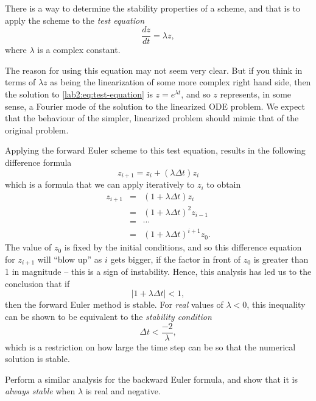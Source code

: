 There is a way to determine the stability properties of a scheme, and
that is to apply the scheme to the \emph{ test equation}
\begin{equation}
\frac{dz}{dt} = \lambda z, \label{lab2:eq:test-equation}
\end{equation}
where $\lambda$ is a complex constant.
\begin{note}
The reason for using this
equation may not seem very clear.  But if you think in terms of
$\lambda z$ as being the linearization of some more complex right hand
side, then the solution to \eqref{lab2:eq:test-equation} is
$z=e^{\lambda t}$, and so $z$ 
represents, in some sense, a Fourier 
mode of the solution to the linearized ODE problem.  
We expect that the behaviour of the simpler, linearized problem should
mimic that of the original problem.
\end{note}  
Applying the forward Euler scheme to this test equation, results  in
the following difference formula
\[ z_{i+1} = z_i+(\lambda \Delta t)z_i \]
which is a formula that we can apply iteratively to $z_i$ to obtain
\begin{eqnarray*}
z_{i+1} &=& (1+\lambda \Delta t)z_{i} \\
        &=& (1+\lambda \Delta t)^2 z_{i-1} \\
        &=& \cdots \\
        &=& (1+\lambda \Delta t)^{i+1} z_{0}.
\end{eqnarray*}
The value of $z_0$ is fixed by the initial conditions, and so this
difference equation for $z_{i+1}$ will ``blow up'' as $i$ gets bigger,
if the factor in front of $z_0$ is greater than 1 in magnitude -- this
is a sign of instability.
Hence, this analysis has led us to the conclusion that if 
\[
|1+\lambda\Delta t| < 1,
\]
then the forward Euler method is stable.
For \emph{ real} values of $\lambda<0$, this inequality can be shown to be
equivalent to the \emph{ stability condition}
\[
\Delta t < \frac{-2}{\lambda},
\]
which is a restriction on how large the time step can be so that the
numerical solution is stable.

\begin{problem}
  \label{lab2:prob:test-backward-euler}
  Perform a similar analysis for the backward Euler formula, and show
  that it is \emph{ always stable} when $\lambda$ is real and
  negative.   
\end{problem}

